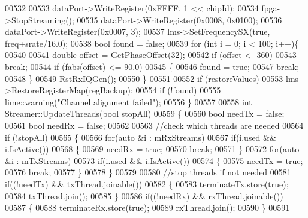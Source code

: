 \begin{DoxyCode}
00532 
00533     dataPort->WriteRegister(0xFFFF, 1 << chipId);
00534     fpga->StopStreaming();
00535     dataPort->WriteRegister(0x0008, 0x0100);
00536     dataPort->WriteRegister(0x0007, 3);
00537     lms->SetFrequencySX(\textcolor{keyword}{true}, freq+srate/16.0);
00538     \textcolor{keywordtype}{bool} found = \textcolor{keyword}{false};
00539     \textcolor{keywordflow}{for} (\textcolor{keywordtype}{int} i = 0; i < 100; i++)\{
00540 
00541         \textcolor{keywordtype}{double} offset = GetPhaseOffset(32);
00542         \textcolor{keywordflow}{if} (offset < -360)
00543             \textcolor{keywordflow}{break};
00544         \textcolor{keywordflow}{if} (fabs(offset) <= 90.0)
00545         \{
00546             found = \textcolor{keyword}{true};
00547             \textcolor{keywordflow}{break};
00548         \}
00549         RstRxIQGen();
00550     \}
00551 
00552     \textcolor{keywordflow}{if} (restoreValues)
00553         lms->RestoreRegisterMap(regBackup);
00554     \textcolor{keywordflow}{if} (!found)
00555         lime::warning(\textcolor{stringliteral}{"Channel alignment failed"});
00556 \}
00557 
00558 \textcolor{keywordtype}{int} Streamer::UpdateThreads(\textcolor{keywordtype}{bool} stopAll)
00559 \{
00560     \textcolor{keywordtype}{bool} needTx = \textcolor{keyword}{false};
00561     \textcolor{keywordtype}{bool} needRx = \textcolor{keyword}{false};
00562 
00563     \textcolor{comment}{//check which threads are needed}
00564     \textcolor{keywordflow}{if} (!stopAll)
00565     \{
00566         \textcolor{keywordflow}{for}(\textcolor{keyword}{auto} &i : mRxStreams)
00567             \textcolor{keywordflow}{if}(i.used && i.IsActive())
00568             \{
00569                 needRx = \textcolor{keyword}{true};
00570                 \textcolor{keywordflow}{break};
00571             \}
00572         \textcolor{keywordflow}{for}(\textcolor{keyword}{auto} &i : mTxStreams)
00573             \textcolor{keywordflow}{if}(i.used && i.IsActive())
00574             \{
00575                 needTx = \textcolor{keyword}{true};
00576                 \textcolor{keywordflow}{break};
00577             \}
00578     \}
00579 
00580     \textcolor{comment}{//stop threads if not needed}
00581     \textcolor{keywordflow}{if}((!needTx) && txThread.joinable())
00582     \{
00583         terminateTx.store(\textcolor{keyword}{true});
00584         txThread.join();
00585     \}
00586     \textcolor{keywordflow}{if}((!needRx) && rxThread.joinable())
00587     \{
00588         terminateRx.store(\textcolor{keyword}{true});
00589         rxThread.join();
00590     \}
00591 

\end{DoxyCode}
